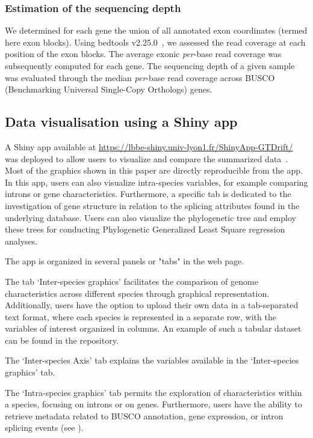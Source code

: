 \subsubsection{Estimation of the sequencing depth}
We determined for each gene the union of all annotated exon coordinates (termed here exon blocks). Using bedtools v2.25.0~\citep{quinlan_bedtools_2010}, we assessed the read coverage at each position of the exon blocks. The average exonic \textit{per}-base read coverage was subsequently computed for each gene. The sequencing depth of a given sample was evaluated through the median \textit{per}-base read coverage across \acrshort{BUSCO} (Benchmarking Universal Single-Copy Orthologs) genes.

\subsection{Data visualisation using a Shiny app}
A Shiny app available at \url{https://lbbe-shiny.univ-lyon1.fr/ShinyApp-GTDrift/} was deployed to allow users to visualize and compare the summarized data~\citep{chang_shiny_2024}. Most of the graphics shown in this paper are directly reproducible from the app. In this app, users can also visualize intra-species variables, for example comparing introns or gene characteristics. Furthermore, a specific tab is dedicated to the investigation of gene structure in relation to the splicing attributes found in the underlying database. Users can also visualize the phylogenetic tree and employ these trees for conducting Phylogenetic Generalized Least Square regression analyses.

The app is organized in several panels or "tabs" in the web page.

The tab `Inter-species graphics' facilitates the comparison of genome characteristics across different species through graphical representation. Additionally, users have the option to upload their own data in a tab-separated text format, where each species is represented in a separate row, with the variables of interest organized in columns. An example of such a tabular dataset can be found in the repository. 

The `Inter-species Axis' tab explains the variables available in the `Inter-species graphics' tab.

The `Intra-species graphics' tab permits the exploration of characteristics within a species, focusing on introns or on genes. Furthermore, users have the ability to retrieve metadata related to \acrshort{BUSCO} annotation, gene expression, or intron splicing events (see ).

